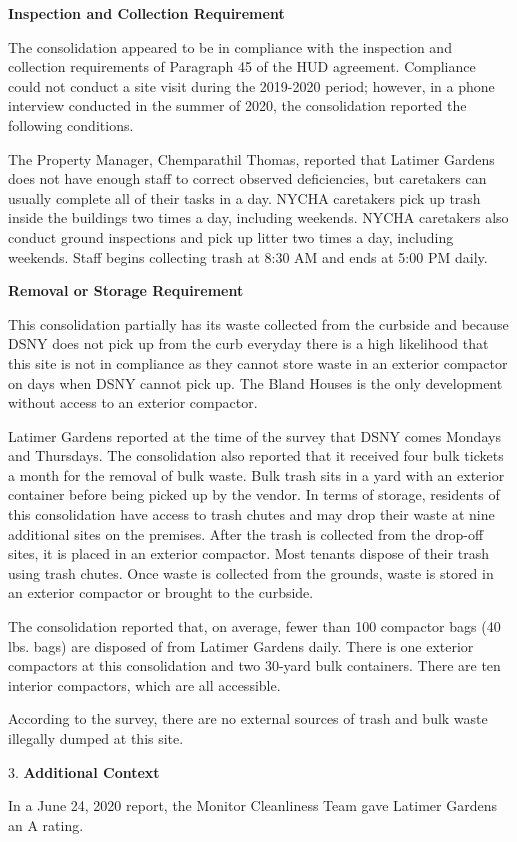 

\textbf{Inspection and Collection Requirement}

The consolidation appeared to be in compliance with the inspection and collection requirements of Paragraph 45 of the HUD agreement. Compliance could not conduct a site visit during the 2019-2020 period; however, in a phone interview conducted in the summer of 2020, the consolidation reported the following conditions.

The Property Manager, Chemparathil Thomas, reported that Latimer Gardens does not have enough staff to correct observed deficiencies, but caretakers can usually complete all of their tasks in a day. NYCHA caretakers pick up trash inside the buildings two times a day, including weekends. NYCHA caretakers also conduct ground inspections and pick up litter two times a day, including weekends. Staff begins collecting trash at 8:30 AM and ends at 5:00 PM daily. 

\textbf{Removal or Storage Requirement}

This consolidation partially has its waste collected from the curbside and because DSNY does not pick up from the curb everyday there is a high likelihood that this site is not in compliance as they cannot store waste in an exterior compactor on days when DSNY cannot pick up. The Bland Houses is the only development without access to an exterior compactor.

Latimer Gardens reported at the time of the survey that DSNY comes Mondays and Thursdays. The consolidation also reported that it received four bulk tickets a month for the removal of bulk waste. Bulk trash sits in a yard with an exterior container before being picked up by the vendor. In terms of storage, residents of this consolidation have access to trash chutes and may drop their waste at nine additional sites on the premises. After the trash is collected from the drop-off sites, it is placed in an exterior compactor. Most tenants dispose of their trash using trash chutes. Once waste is collected from the grounds, waste is stored in an exterior compactor or brought to the curbside. 

The consolidation reported that, on average, fewer than 100 compactor bags (40 lbs. bags) are disposed of from Latimer Gardens daily. There is one exterior compactors at this consolidation and two 30-yard bulk containers. There are ten interior compactors, which are all accessible.

According to the survey, there are no external sources of trash and bulk waste illegally dumped at this site. 

3. \textbf{Additional Context} 

In a June 24, 2020 report, the Monitor Cleanliness Team gave Latimer Gardens an A rating. 